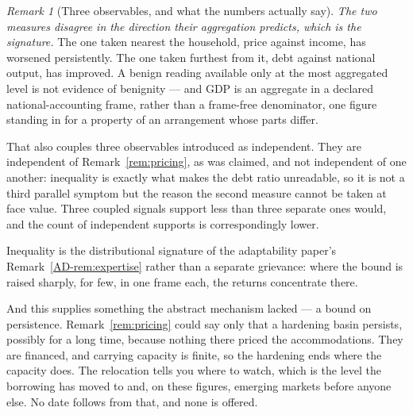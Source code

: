 \documentclass[11pt,a4paper]{article}
\theoremstyle{remark}
\newtheorem{remark}[definition]{Remark}
\begin{document}
\begin{remark}[Three observables, and what the numbers actually say]
\emph{The two measures disagree in the direction their aggregation predicts, which is the signature.} The
one taken nearest the household, price against income, has worsened persistently. The one taken furthest
from it, debt against national output, has improved. A benign reading available only at the most
aggregated level is not evidence of benignity --- and GDP is an aggregate in a declared national-accounting frame, rather than a frame-free denominator, one figure standing in for a property of an
arrangement whose parts differ.

That also couples three observables introduced as independent. They are independent of
Remark~\ref{rem:pricing}, as was claimed, and not independent of one another: inequality is
exactly what makes the debt ratio unreadable, so it is not a third parallel symptom but the reason the
second measure cannot be taken at face value. Three coupled signals support less than three
separate ones would, and the count of independent supports is correspondingly lower.

Inequality is the distributional signature of the adaptability paper's Remark~\ref{AD-rem:expertise} rather than a separate
grievance: where the bound is raised sharply, for few, in one frame each, the returns concentrate there.

And this supplies something the abstract mechanism lacked --- a bound on persistence.
Remark~\ref{rem:pricing} could say only that a hardening basin persists, possibly for a long time,
because nothing there priced the accommodations. They are financed, and carrying capacity is
finite, so the hardening ends where the capacity does. The relocation tells you where to watch,
which is the level the borrowing has moved to and, on these figures, emerging markets before anyone
else. No date follows from that, and none is offered.
\end{remark}
\end{document}
